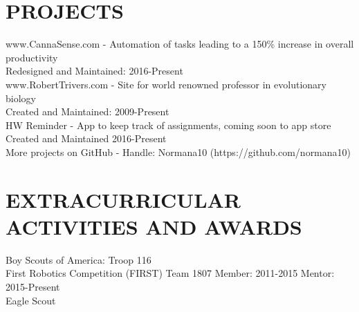 \documentclass{res}
\begin{document}
\begin{resume}
\section{PROJECTS}
	www.CannaSense.com - Automation of tasks leading to a 150\% increase in overall productivity\\
		Redesigned and Maintained: 2016-Present\\
	www.RobertTrivers.com - Site for world renowned professor in evolutionary biology\\
		Created and Maintained: 2009-Present\\
	HW Reminder - App to keep track of assignments, coming soon to app store \\
		Created and Maintained 2016-Present\\
	More projects on GitHub - Handle: Normana10 (https://github.com/normana10)
\vspace{-0.2in}
\section{EXTRACURRICULAR ACTIVITIES AND AWARDS}          
		Boy Scouts of America: Troop 116 \\
		First Robotics Competition (FIRST) Team 1807 Member: 2011-2015 Mentor: 2015-Present\\
		Eagle Scout
\end{resume}
\end{document}
